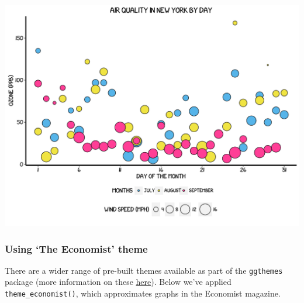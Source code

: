 \documentclass[]{article}
\begin{document}
\begin{center}\includegraphics{0_all_posts_pdf/wscatter_18-1} \end{center}

\subsubsection{\texorpdfstring{Using `The Economist'
theme}{Using The Economist theme}}\label{using-the-economist-theme-5}

There are a wider range of pre-built themes available as part of the
\texttt{ggthemes} package (more information on these
\href{https://cran.r-project.org/web/packages/ggthemes/vignettes/ggthemes.html}{here}).
Below we've applied \texttt{theme\_economist()}, which approximates
graphs in the Economist magazine.
\end{document}
